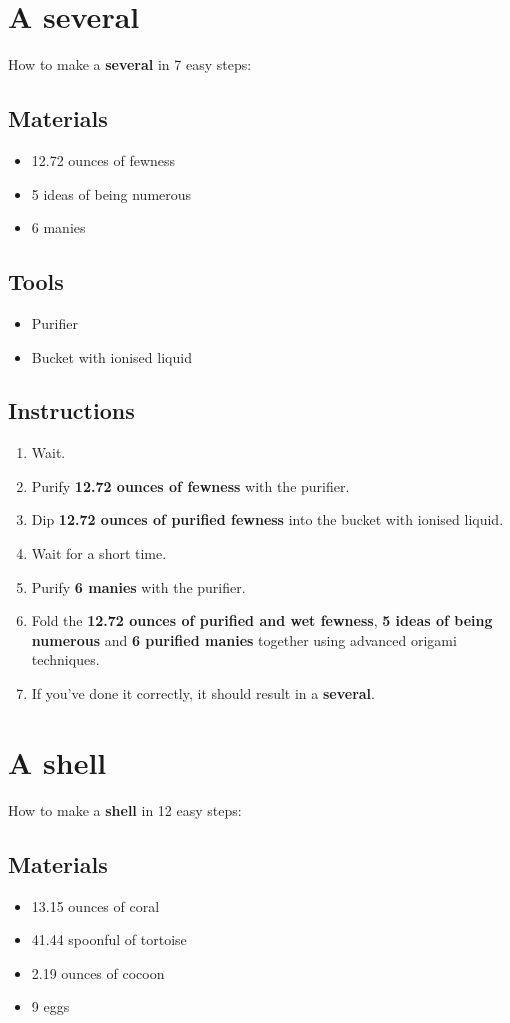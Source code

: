 \documentclass{article}
\begin{document}
\section{A several}How to make a \textbf{several} in 7 easy steps:

\subsection{Materials}\begin{itemize}
\item 
12.72 ounces of fewness
\item 
5 ideas of being numerous
\item 
6 manies
\end{itemize}
\subsection{Tools}\begin{itemize}
\item 
Purifier
\item 
Bucket with ionised liquid
\end{itemize}
\subsection{Instructions}\begin{enumerate}
\item 
Wait.
\item 
Purify \textbf{12.72 ounces of fewness} with the purifier.
\item 
Dip \textbf{12.72 ounces of purified fewness} into the bucket with ionised liquid.
\item 
Wait for a short time.
\item 
Purify \textbf{6 manies} with the purifier.
\item 
Fold the \textbf{12.72 ounces of purified and wet fewness}, \textbf{5 ideas of being numerous} and \textbf{6 purified manies} together using advanced origami techniques.
\item 
If you've done it correctly, it should result in a \textbf{several}.
\end{enumerate}
\newpage
\section{A shell}How to make a \textbf{shell} in 12 easy steps:

\subsection{Materials}\begin{itemize}
\item 
13.15 ounces of coral
\item 
41.44 spoonful of tortoise
\item 
2.19 ounces of cocoon
\item 
9 eggs
\end{itemize}
\end{document}

